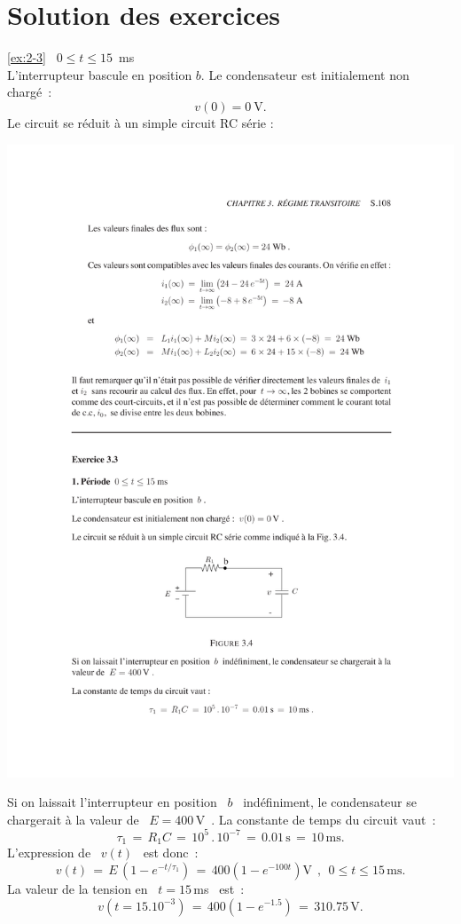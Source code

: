 \section{Solution des exercices}
\begin{solexercise}{\ref{ex:2-3}} \label{solex:2-3}
 \ $0 \leq t \leq 15$~ms\\
L'interrupteur bascule en position $b$. 
Le condensateur est initialement non charg\'e~: $$v(0) = 0 \ \text{V}.$$
Le circuit se r\'eduit \`a un simple circuit RC s\'erie :
\begin{center}
\includegraphics[width=0.55\linewidth]{sol_exercices/ex3-3-1}
\end{center}
Si on laissait l'interrupteur en position \ $b$ \ ind\'efiniment, le
condensateur se chargerait \`a la valeur de \ $E = 400\,$V~.
La constante de temps du circuit vaut~:
\[ \tau_1 \, = \, R_1C \, = \, 10^5\, . \, 10^{-7}\, 
= \, 0.01\,\mbox{s}\, = \, 10\,\mbox{ms}. \]
L'expression de \ $v(t)$ \ est donc~:
\[ v(t) \, = \, E\, \left( 1-e^{-t/\tau_1}\right)  \, 
= \, 400\left( 1 - e^{-100t}\right) \mbox{V}~~, ~~0 \leq t \leq 15\,\mbox{ms}. \] 
La valeur de la tension en \ $t=15\,$ms \ est~:
\[ v \left( t=15.10^{-3}\right) \, = \, 400\left( 1-e^{-1.5}\right) \, 
= \, 310.75\,\mbox{V}. \]


\end{solexercise}
